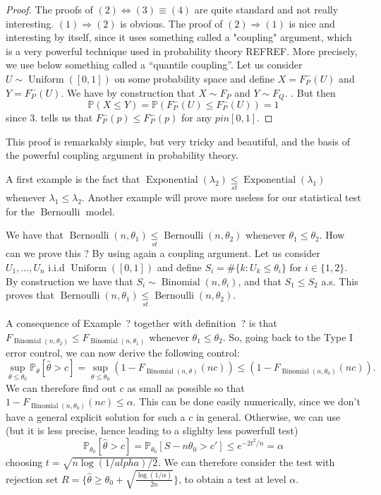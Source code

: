\documentclass[
	fontsize=11pt, %
	twoside=false, %
	numbers=noenddot, %
]{kaobook}
\DeclareMathOperator{\ber}{Bernoulli}
\DeclareMathOperator{\bin}{Binomial}
\DeclareMathOperator{\expo}{Exponential}
\DeclareMathOperator{\uni}{Uniform}
\renewcommand{\P}{\mathbb P}
\newcommand{\wh}{\widehat}
\newcommand{\lest}{\underset{st}{\leq}}
\begin{document}
\begin{proof}
	The proofs of $(2) \Leftrightarrow (3) \equiv (4)$ are quite standard and not really interesting. $(1) \Rightarrow (2)$ is obvious. The proof of $(2) \Rightarrow (1)$ is nice and interesting by itself, since it uses something called a "coupling" argument, which is a very powerful technique used in probability theory REFREF.
	More precisely, we use below something called a ``quantile coupling''.
	Let us consider $U \sim \uni([0, 1])$  on some probability space and define $X = F_P^-(U)$ and $Y = F_P^-(U)$.
	We have by construction that $X \sim F_P$ and $Y \sim F_Q$. . But then
	\begin{equation*}
		\P(X \leq Y) = \P(F_P^-(U) \leq F_P^-(U)) = 1
	\end{equation*}
	since 3. tells us that $F_P^-(p) \leq F_P^-(p)$ for any $p in [0, 1]$.
\end{proof}
This proof is remarkably simple, but very tricky and beautiful, and the basis of the powerful coupling argument in probability theory.

A first example is the fact that $\expo(\lambda_2) \lest \expo(\lambda_1)$ whenever $\lambda_1 \leq \lambda_2$.
Another example will prove more useless for our statistical test for the $\ber$ model.
\begin{example}
	We have that $\ber(n, \theta_1) \lest \ber(n, \theta_2)$ whenever $\theta_1 \leq \theta_2$. How can we prove this ? By using again a coupling argument.
	Let us consider $U_1, \ldots, U_n$ i.i.d $\uni([0, 1])$ and define $S_i = \# \{ k : U_k \leq \theta_i \}$ for $i \in \{ 1, 2 \}$. By construction we have that $S_i \sim \bin(n, \theta_i)$, and that $S_1 \leq S_2$ a.s. This proves that $\ber(n, \theta_1) \lest \ber(n, \theta_2)$.
\end{example}
A consequence of Example~? together with definition~? is that $F_{\bin(n, \theta_2)} \leq F_{\bin(n, \theta_1)}$ whenever $\theta_1 \leq \theta_2$.
So, going back to the Type I error control, we can now derive the following control:
\begin{equation*}
	\sup_{\theta \leq \theta_0} \P_\theta[ \wh \theta > c] = \sup_{\theta \leq \theta_0} (1 - F_{\bin(n, \theta)}(n c)) \leq (1 - F_{\bin(n, \theta_0)}(n c)).
\end{equation*}
We can therefore find out $c$ as small as possible so that $1 - F_{\bin(n, \theta_0)}(n c) \leq \alpha$.
This can be done easily numerically, since we don't have a general explicit solution for such a $c$ in general.
Otherwise, we can use (but it is less precise, hence leading to a slighlty less powerfull test)
\begin{equation*}
	\P_{\theta_0} [\wh \theta > c] = \P_{\theta_0}[S - n \theta_0 > c'] \leq e^{-2 t^2 / n} = \alpha
\end{equation*}
choosing $t = \sqrt{n \log(1 / alpha) / 2}$. 
We can therefore consider the test with rejection set $R = \{ \wh \theta \geq \theta_0 + \sqrt{ \frac{\log(1 / \alpha)}{2n}}\}$, to obtain a test at level $\alpha$.
\end{document}
